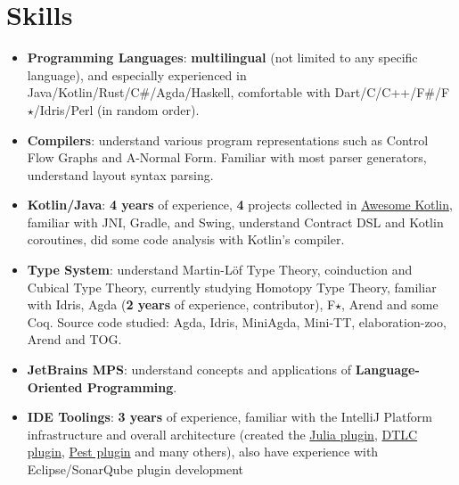 \documentclass{resume}
\begin{document}


\section{Skills}
\begin{itemize}
  \item \textbf{Programming Languages}:
    \textbf{multilingual} (not limited to any specific language),
    and especially experienced in Java/Kotlin/Rust/C\#/Agda/Haskell,
    comfortable with Dart/C/C++/F\#/F$\star$/Idris/Perl (in random order).

  \item \textbf{Compilers}:
    understand various program representations such as Control Flow Graphs
    and A-Normal Form.
    Familiar with most parser generators, understand layout syntax parsing.

  \item \textbf{Kotlin/Java}:
    \textbf{4 years} of experience,
    \textbf{4} projects collected in
    \href{https://kotlin.link/?q=ice} {Awesome Kotlin},
    familiar with JNI, Gradle, and Swing,
    understand Contract DSL and Kotlin coroutines,
    did some code analysis with Kotlin's compiler.

  \item \textbf{Type System}:
    understand Martin-L\"{o}f Type Theory, coinduction and Cubical Type Theory,
    currently studying Homotopy Type Theory,
    familiar with Idris, Agda (\textbf{2 years} of experience, contributor),
    F$\star$, Arend and some Coq.
    \subitem Source code studied: Agda, Idris, MiniAgda, Mini-TT, elaboration-zoo, Arend and TOG.

  \item \textbf{JetBrains MPS}:
    understand concepts and applications of \textbf{Language-Oriented Programming}.

  \item \textbf{IDE Toolings}:
    \textbf{3 years} of experience,
    familiar with the IntelliJ Platform infrastructure and overall
    architecture (created the
    \href{https://plugins.jetbrains.com/plugin/10413}
         {Julia plugin},
    \href{https://plugins.jetbrains.com/plugin/12176}
         {DTLC plugin},
    \href{https://plugins.jetbrains.com/plugin/12046}
         {Pest plugin} and many others), also have experience with Eclipse/SonarQube
    plugin development


\end{itemize}
\end{document}
